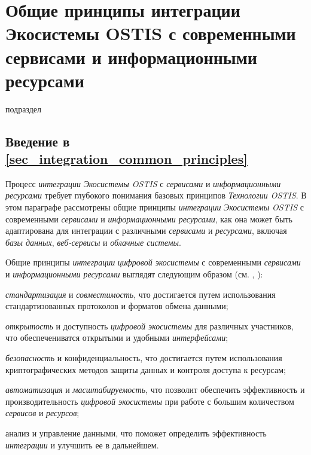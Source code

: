 \section{Общие принципы интеграции Экосистемы OSTIS с современными сервисами и информационными ресурсами}
{\label{sec_integration_common_principles}}

\begin{SCn}
  \begin{scnrelfromlist}{подраздел}
    \end{scnrelfromlist}
\end{SCn}

\subsection*{Введение в \ref{sec_integration_common_principles}}

Процесс \textit{интеграции} \textit{Экосистемы OSTIS} с \textit{сервисами} и \textit{информационными ресурсами} требует глубокого понимания базовых принципов \textit{Технологии OSTIS}. 
В этом параграфе рассмотрены общие принципы \textit{интеграции} \textit{Экосистемы OSTIS} с современными \textit{сервисами} и \textit{информационными ресурсами}, как она может быть адаптирована для интеграции с различными \textit{сервисами} и \textit{ресурсами}, включая \textit{базы данных}, \textit{веб-сервисы} и \textit{облачные системы}.

Общие принципы \textit{интеграции} \textit{цифровой экосистемы} с современными \textit{сервисами} и \textit{информационными ресурсами} выглядят следующим образом (см. , ):
\begin{textitemize}
    \item \textit{стандартизация} и \textit{совместимость}, что достигается путем использования стандартизованных протоколов и форматов обмена данными;
    \item \textit{открытость} и доступность \textit{цифровой экосистемы} для различных участников, что обеспечениватся открытыми и удобными \textit{интерфейсами};
    \item \textit{безопасность} и конфиденциальность, что достигается путем использования криптографических методов защиты данных и контроля доступа к ресурсам;
    \item \textit{автоматизация} и \textit{масштабируемость}, что позволит обеспечить эффективность и производительность \textit{цифровой экосистемы} при работе с большим количеством \textit{сервисов} и \textit{ресурсов};
    \item анализ и управление данными, что поможет определить эффективность \textit{интеграции} и улучшить ее в дальнейшем.
\end{textitemize}

